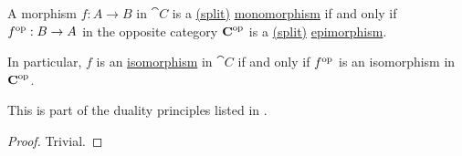\begin{proposition}\label{thm:morphism_invertibility_duality}
  A morphism \( f: A \to B \) in \( \cat{C} \) is a \hyperref[def:morphism_invertibility/left_invertible]{(split)} \hyperref[def:morphism_invertibility/left_cancellative]{monomorphism} if and only if \( f^{\operatorname{op}}: B \to A \) in the opposite category \( \operatorname{\mathbf{C}}^{\operatorname{op}} \) is a \hyperref[def:morphism_invertibility/right_invertible]{(split)} \hyperref[def:morphism_invertibility/right_cancellative]{epimorphism}.

  In particular, \( f \) is an \hyperref[def:morphism_invertibility/isomorphism]{isomorphism} in \( \cat{C} \) if and only if \( f^{\operatorname{op}} \) is an isomorphism in \( \operatorname{\mathbf{C}}^{\operatorname{op}} \).

  This is part of the duality principles listed in .
\end{proposition}
\begin{proof}
  Trivial.
\end{proof}

